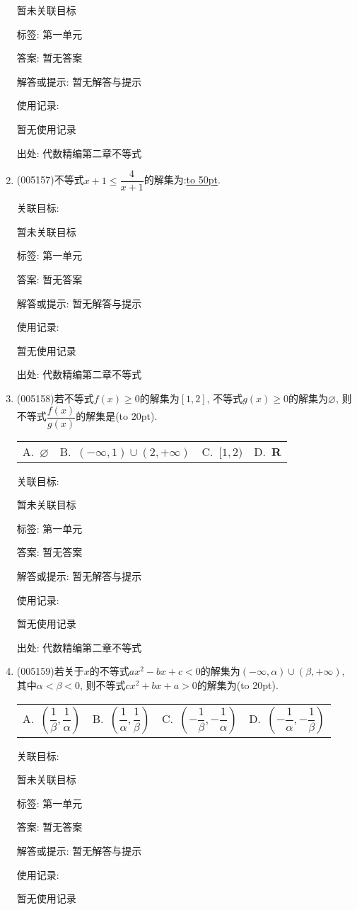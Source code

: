 \documentclass[10pt,a4paper]{article}
\newcommand{\blank}[1]{\underline{\hbox to #1pt{}}}
\newcommand{\bracket}[1]{(\hbox to #1pt{})}
\newcommand{\fourch}[4]{\par\begin{tabular}{p{.23\textwidth}p{.23\textwidth}p{.23\textwidth}p{.23\textwidth}}
A.~#1 &B.~#2& C.~#3& D.~#4
\end{tabular}}
\begin{document}
\begin{enumerate}[1.]
暂未关联目标



标签: 第一单元

答案: 暂无答案

解答或提示: 暂无解答与提示

使用记录:

暂无使用记录


出处: 代数精编第二章不等式
\item { (005157)}不等式$x+1\le \dfrac 4{x+1}$的解集为:\blank{50}.


关联目标:

暂未关联目标



标签: 第一单元

答案: 暂无答案

解答或提示: 暂无解答与提示

使用记录:

暂无使用记录


出处: 代数精编第二章不等式
\item { (005158)}若不等式$f(x)\ge 0$的解集为$[1,2]$, 不等式$g(x)\ge 0$的解集为$\varnothing$, 则不等式$\dfrac{f(x)}{g(x)}$的解集是\bracket{20}.
\fourch{$\varnothing$}{$(-\infty ,1)\cup (2,+\infty)$}{$[1,2)$}{$\mathbf{R}$}


关联目标:

暂未关联目标



标签: 第一单元

答案: 暂无答案

解答或提示: 暂无解答与提示

使用记录:

暂无使用记录


出处: 代数精编第二章不等式
\item { (005159)}若关于$x$的不等式$ax^2-bx+c<0$的解集为$(-\infty ,\alpha)\cup (\beta ,+\infty)$, 其中$\alpha <\beta <0$, 则不等式$cx^2+bx+a>0$的解集为\bracket{20}.
\fourch{$(\dfrac 1{\beta},\dfrac 1{\alpha})$}{$(\dfrac 1{\alpha},\dfrac 1{\beta})$}{$(-\dfrac 1{\beta},-\dfrac 1{\alpha})$}{$(-\dfrac 1{\alpha},-\dfrac 1{\beta})$}


关联目标:

暂未关联目标



标签: 第一单元

答案: 暂无答案

解答或提示: 暂无解答与提示

使用记录:

暂无使用记录



\end{enumerate}
\end{document}
